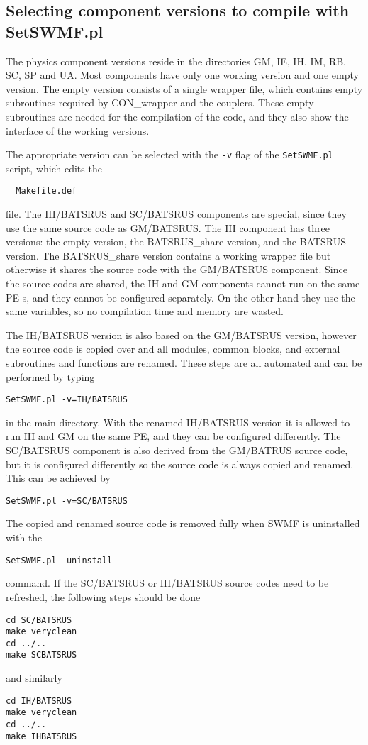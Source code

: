 \subsection{Selecting component versions to compile with SetSWMF.pl}

The physics component versions reside in the directories 
GM, IE, IH, IM, RB, SC,
SP and UA.
Most components have only one working version and one empty version.
The empty version consists of a single wrapper file, which contains 
empty subroutines required by CON\_wrapper and the couplers.
These empty subroutines are needed for the compilation of the code,
and they also show the interface of the working versions.

The appropriate version can be selected with the {\tt -v} flag
of the {\tt SetSWMF.pl} script, which edits the
\begin{verbatim}
  Makefile.def
\end{verbatim}
file. The IH/BATSRUS and SC/BATSRUS components are special, since they use the
same source code as GM/BATSRUS. The IH component has three versions: 
the empty version, the BATSRUS\_share version, and the BATSRUS version. 
The BATSRUS\_share version contains a working wrapper file but otherwise 
it shares the source code
with the GM/BATSRUS component. Since the source codes are shared, the
IH and GM components cannot run on the same PE-s, and they cannot be
configured separately. On the other hand they use the same variables,
so no compilation time and memory are wasted.

The IH/BATSRUS version is also based on the GM/BATSRUS version, however
the source code is copied over and all modules, common blocks,
and external subroutines and functions are renamed. 
These steps are all automated and can be performed by typing
\begin{verbatim}
SetSWMF.pl -v=IH/BATSRUS
\end{verbatim}
in the main directory. With the renamed IH/BATSRUS version it is allowed 
to run IH and GM on the same PE, and they can be configured differently.
The SC/BATSRUS component is also derived from the GM/BATRUS source code,
but it is configured differently so the source code is always copied
and renamed. This can be achieved by
\begin{verbatim}
SetSWMF.pl -v=SC/BATSRUS
\end{verbatim}
The copied and renamed source code is removed fully when SWMF is
uninstalled with the
\begin{verbatim}
SetSWMF.pl -uninstall
\end{verbatim}
command. If the SC/BATSRUS or IH/BATSRUS source codes need to be
refreshed, the following steps should be done
\begin{verbatim}
cd SC/BATSRUS
make veryclean
cd ../..
make SCBATSRUS
\end{verbatim}
and similarly
\begin{verbatim}
cd IH/BATSRUS
make veryclean
cd ../..
make IHBATSRUS
\end{verbatim}

